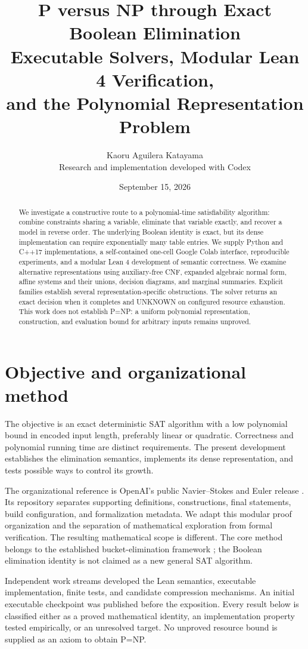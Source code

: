 \documentclass[11pt]{article}
\title{P versus NP through Exact Boolean Elimination\\
\large Executable Solvers, Modular Lean 4 Verification,\\
and the Polynomial Representation Problem}
\author{Kaoru Aguilera Katayama\\
\small Research and implementation developed with Codex}
\date{September 15, 2026}
\begin{document}
\maketitle
\begin{abstract}
We investigate a constructive route to a polynomial-time satisfiability
algorithm: combine constraints sharing a variable, eliminate that variable
exactly, and recover a model in reverse order. The underlying Boolean
identity is exact, but its dense implementation can require exponentially
many table entries. We supply Python and C++17 implementations, a
self-contained one-cell Google Colab interface, reproducible experiments,
and a modular Lean 4 development of semantic correctness.
We examine alternative representations using auxiliary-free CNF, expanded
algebraic normal form, affine systems and their unions, decision diagrams,
and marginal summaries. Explicit families establish several
representation-specific obstructions. The solver returns an exact decision
when it completes and UNKNOWN on configured resource exhaustion.
This work does not establish P=NP: a uniform polynomial representation,
construction, and evaluation bound for arbitrary inputs remains unproved.
\end{abstract}
\tableofcontents

\section{Objective and organizational method}
The objective is an exact deterministic SAT algorithm with a low polynomial
bound in encoded input length, preferably linear or quadratic. Correctness
and polynomial running time are distinct requirements. The present
development establishes the elimination semantics, implements its dense
representation, and tests possible ways to control its growth.

The organizational reference is OpenAI's public Navier--Stokes and Euler
release \cite{openai,openai-repo}. Its repository separates supporting
definitions, constructions, final statements, build configuration, and
formalization metadata. We adapt this modular proof organization and the
separation of mathematical exploration from formal verification.
The resulting mathematical scope is different.
The core method belongs to the established bucket-elimination framework
\cite{dechter}; the Boolean elimination identity is not claimed as a new
general SAT algorithm.

Independent work streams developed the Lean semantics, executable
implementation, finite tests, and candidate compression mechanisms.
An initial executable checkpoint was published before the exposition.
Every result below is classified either as a proved mathematical identity,
an implementation property tested empirically, or an unresolved target.
No unproved resource bound is supplied as an axiom to obtain P=NP.
\end{document}
